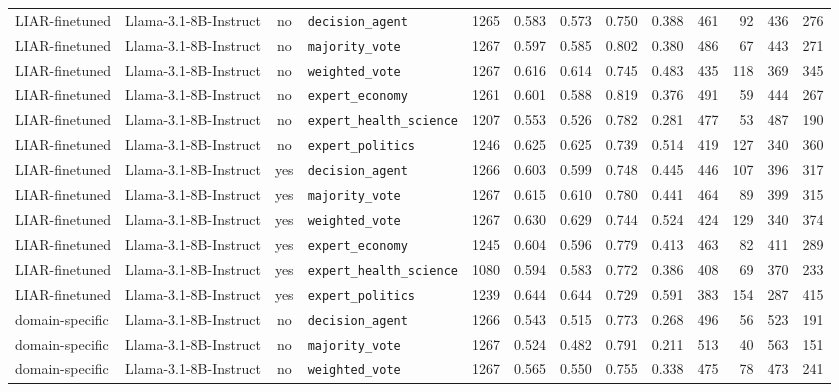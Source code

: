 \begin{landscape}
\begin{longtable}{@{}l p{3.2cm} c l r r r r r r r r r@{}}
\midrule
LIAR-finetuned & Llama-3.1-8B-Instruct & no & \texttt{decision\_agent} & 1265 & 0.583 & 0.573 & 0.750 & 0.388 & 461 & 92 & 436 & 276\\
LIAR-finetuned & Llama-3.1-8B-Instruct & no & \texttt{majority\_vote} & 1267 & 0.597 & 0.585 & 0.802 & 0.380 & 486 & 67 & 443 & 271\\
LIAR-finetuned & Llama-3.1-8B-Instruct & no & \texttt{weighted\_vote} & 1267 & 0.616 & 0.614 & 0.745 & 0.483 & 435 & 118 & 369 & 345\\
LIAR-finetuned & Llama-3.1-8B-Instruct & no & \texttt{expert\_economy} & 1261 & 0.601 & 0.588 & 0.819 & 0.376 & 491 & 59 & 444 & 267\\
LIAR-finetuned & Llama-3.1-8B-Instruct & no & \texttt{expert\_health\_science} & 1207 & 0.553 & 0.526 & 0.782 & 0.281 & 477 & 53 & 487 & 190\\
LIAR-finetuned & Llama-3.1-8B-Instruct & no & \texttt{expert\_politics} & 1246 & 0.625 & 0.625 & 0.739 & 0.514 & 419 & 127 & 340 & 360\\
LIAR-finetuned & Llama-3.1-8B-Instruct & yes & \texttt{decision\_agent} & 1266 & 0.603 & 0.599 & 0.748 & 0.445 & 446 & 107 & 396 & 317\\
LIAR-finetuned & Llama-3.1-8B-Instruct & yes & \texttt{majority\_vote} & 1267 & 0.615 & 0.610 & 0.780 & 0.441 & 464 & 89 & 399 & 315\\
LIAR-finetuned & Llama-3.1-8B-Instruct & yes & \texttt{weighted\_vote} & 1267 & 0.630 & 0.629 & 0.744 & 0.524 & 424 & 129 & 340 & 374\\
LIAR-finetuned & Llama-3.1-8B-Instruct & yes & \texttt{expert\_economy} & 1245 & 0.604 & 0.596 & 0.779 & 0.413 & 463 & 82 & 411 & 289\\
LIAR-finetuned & Llama-3.1-8B-Instruct & yes & \texttt{expert\_health\_science} & 1080 & 0.594 & 0.583 & 0.772 & 0.386 & 408 & 69 & 370 & 233\\
LIAR-finetuned & Llama-3.1-8B-Instruct & yes & \texttt{expert\_politics} & 1239 & 0.644 & 0.644 & 0.729 & 0.591 & 383 & 154 & 287 & 415\\
\midrule
domain-specific & Llama-3.1-8B-Instruct & no & \texttt{decision\_agent} & 1266 & 0.543 & 0.515 & 0.773 & 0.268 & 496 & 56 & 523 & 191\\
domain-specific & Llama-3.1-8B-Instruct & no & \texttt{majority\_vote} & 1267 & 0.524 & 0.482 & 0.791 & 0.211 & 513 & 40 & 563 & 151\\
domain-specific & Llama-3.1-8B-Instruct & no & \texttt{weighted\_vote} & 1267 & 0.565 & 0.550 & 0.755 & 0.338 & 475 & 78 & 473 & 241\\

\end{longtable}
\end{landscape}

